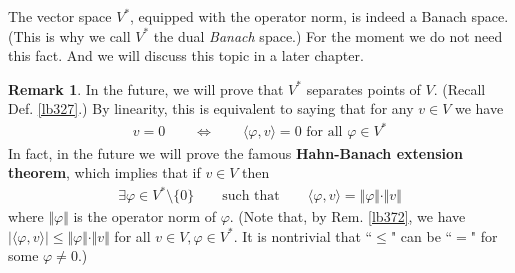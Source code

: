 \documentclass[12pt,b5paper,notitlepage]{article}
\theoremstyle{definition}
\newtheorem{rem}[df]{Remark}
\theoremstyle{plain}
\newcommand{\fk}{\mathfrak}
\newcommand{\ovl}{\overline}
\newcommand{\bk}[1]{\langle {#1}\rangle}
\numberwithin{equation}{section}
\begin{document}
The vector space $V^*$, equipped with the operator norm, is indeed a Banach space. (This is why we call $V^*$ the dual \textit{Banach} space.) For the moment we do not need this fact. And we will discuss this topic in a later chapter.



\begin{rem}\label{lb393}
In the future, we will prove that $V^*$ separates points of $V$. (Recall Def. \ref{lb327}.) By linearity, this is equivalent to saying that for any $v\in V$ we have
\begin{align}\label{eq115}
v=0\qquad\Longleftrightarrow\qquad\bk{\varphi,v}=0\text{ for all }\varphi\in V^*
\end{align}
In fact, in the future we will prove the famous \textbf{Hahn-Banach extension theorem}, which implies that if $v\in V$ then
\begin{align}
\exists \varphi\in V^*\setminus\{0\}\qquad\text{such that}\qquad\bk{\varphi,v}=\Vert\varphi\Vert\cdot\Vert v\Vert \label{eq116}
\end{align}
where $\Vert\varphi\Vert$ is the operator norm of $\varphi$. (Note that, by Rem. \ref{lb372}, we have $|\bk{\varphi,v}|\leq\Vert\varphi\Vert\cdot\Vert v\Vert$ for all $v\in V,\varphi\in V^*$. It is nontrivial that ``$\leq$" can be ``$=$" for some $\varphi\neq0$.)
\end{rem}




\begin{comment}
From \eqref{eq118}, it is clear that for any $v\in V,\varphi\in V^*$ we have
\begin{align}
|\bk{\varphi,v}|\leq\Vert\varphi\Vert\cdot\Vert v\Vert \label{eq119}
\end{align}
Thus, the inequality ``$\geq$" trivially holds in \eqref{eq116}. The ``$\leq$" in \eqref{eq116} is nontrivial. 

\begin{rem}\label{lb328}
If we equip the \textbf{double dual space} \index{00@Double dual space $V^{**}$} $V^{**}=(V^*)^*$ \index{V@$V^{**}=(V^*)^*$} with the operator norm, then for each $\fk v\in V^{**}$, by \eqref{eq120} we have
\begin{align*}
\Vert\fk v\Vert=\sup_{\varphi\in \ovl B_{V^*}(0,1)}|\bk{\fk v,\varphi}|
\end{align*}
From this relation, it is clear that \eqref{eq116} holds if and only if the canonical linear map 
\begin{gather}
V\rightarrow V^{**}\qquad v\mapsto \bk{\cdot ,v}  \label{eq117}
\end{gather} 
(where $\bk{\cdot,v}$ sends each $\varphi\in V^*$ to $\bk{\varphi,v}=\varphi(v)$) is an isometry.
\end{rem}

\end{comment}
\end{document}
